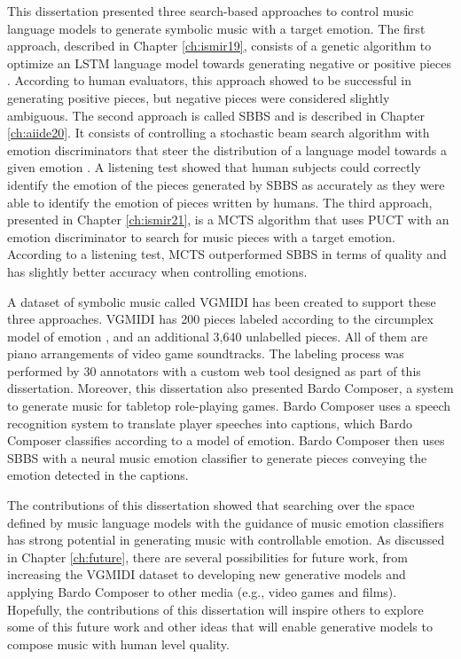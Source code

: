 This dissertation presented three search-based approaches to control music language models to generate symbolic music with a target emotion. The first approach, described in Chapter \ref{ch:ismir19}, consists of a genetic algorithm to optimize an LSTM language model towards generating negative or positive pieces \cite{ferreira_2019}. According to human evaluators, this approach showed to be successful in generating positive pieces, but negative pieces were considered slightly ambiguous. The second approach is called SBBS and is described in Chapter \ref{ch:aiide20}. It consists of controlling a stochastic beam search algorithm with emotion discriminators that steer the distribution of a language model towards a given emotion \cite{ferreira2020computer}. A listening test showed that human subjects could correctly identify the emotion of the pieces generated by SBBS as accurately as they were able to identify the emotion of pieces written by humans. The third approach, presented in Chapter \ref{ch:ismir21}, is a MCTS algorithm that uses PUCT with an emotion discriminator to search for music pieces with a target emotion. According to a listening test, MCTS outperformed SBBS in terms of quality and has slightly better accuracy when controlling emotions.

A dataset of symbolic music called VGMIDI has been created to support these three approaches. VGMIDI has 200 pieces labeled according to the circumplex model of emotion \cite{russell1980circumplex}, and an additional 3,640 unlabelled pieces. All of them are piano arrangements of video game soundtracks. The labeling process was performed by 30 annotators with a custom web tool designed as part of this dissertation. Moreover, this dissertation also presented Bardo Composer, a system to generate music for tabletop role-playing games. Bardo Composer uses a speech recognition system to translate player speeches into captions, which Bardo Composer classifies according to a model of emotion. Bardo Composer then uses SBBS with a neural music emotion classifier to generate pieces conveying the emotion detected in the captions.

The contributions of this dissertation showed that searching over the space defined by music language models with the guidance of music emotion classifiers has strong potential in generating music with controllable emotion. As discussed in Chapter \ref{ch:future}, there are several possibilities for future work, from increasing the VGMIDI dataset to developing new generative models and applying Bardo Composer to other media (e.g., video games and films). Hopefully, the contributions of this dissertation will inspire others to explore some of this future work and other ideas that will enable generative models to compose music with human level quality.

